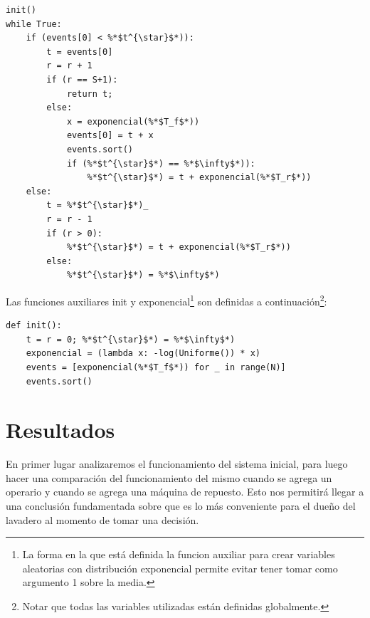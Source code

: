 \documentclass[10pt,a4paper]{article} %
\begin{document}
    \begin{lstlisting}[caption=Funciones auxiliares.]
init()
while True:
    if (events[0] < %*$t^{\star}$*)):
        t = events[0]
        r = r + 1
        if (r == S+1):
            return t;
        else:
            x = exponencial(%*$T_f$*))
            events[0] = t + x
            events.sort()
            if (%*$t^{\star}$*) == %*$\infty$*)):
                %*$t^{\star}$*) = t + exponencial(%*$T_r$*))
    else: 
        t = %*$t^{\star}$*)_
        r = r - 1
        if (r > 0):
            %*$t^{\star}$*) = t + exponencial(%*$T_r$*))
        else:
            %*$t^{\star}$*) = %*$\infty$*)
    \end{lstlisting}
Las funciones auxiliares init y exponencial\footnote{La forma en la que est\'a definida la funcion auxiliar para crear variables aleatorias con distribuci\'on exponencial permite evitar tener tomar como argumento 1 sobre la media.} son definidas a continuaci\'on\footnote{Notar que todas las variables utilizadas est\'an definidas globalmente.}:
    \begin{lstlisting}[caption=Pseudo-c\'odigo del las funciones auxiliares.]
def init():
    t = r = 0; %*$t^{\star}$*) = %*$\infty$*)
    exponencial = (lambda x: -log(Uniforme()) * x)
    events = [exponencial(%*$T_f$*)) for _ in range(N)]
    events.sort()
    \end{lstlisting}
    
    \newpage
    \section{Resultados}
    En primer lugar analizaremos el funcionamiento del sistema inicial, para luego hacer una comparaci\'on del funcionamiento del mismo cuando se agrega un operario y cuando se agrega una m\'aquina de repuesto. Esto nos permitir\'a llegar a una conclusi\'on fundamentada sobre que es lo m\'as conveniente para el due\~no del lavadero al momento de tomar una decisi\'on.
    
\end{document}
